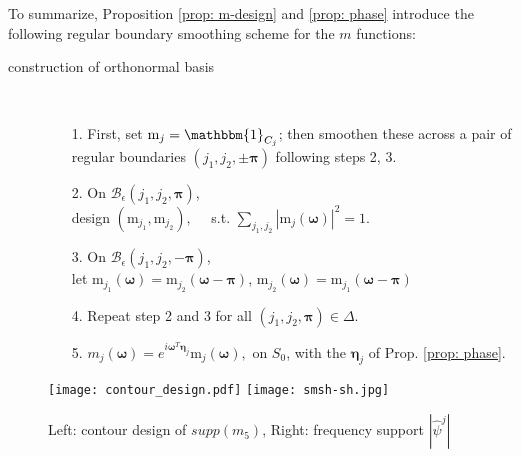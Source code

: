 To summarize, Proposition \ref{prop: m-design} and \ref{prop: phase} introduce the following regular boundary smoothing scheme for the $m$ functions:
\begin{description}%
\item[construction of orthonormal basis]\
\begin{itemize}
\item[1.] First, set $\mathrm{m}_j = \mathbbm{1}_{C_j}$; then smoothen these across a pair of regular boundaries $(j_1,j_2,\pm\boldsymbol{\pi})$ following steps 2, 3.
\item[2.]  On $\mathcal{B}_{\epsilon}(j_1,j_2,\boldsymbol{\pi})$,\\
\hspace*{2em} design $(\mathrm{m}_{j_1},\mathrm{m}_{j_2}),\quad$ s.t.
$\sum_{j_1,j_2}|\mathrm{m}_{j}(\boldsymbol{\omega})|^2= 1$.
\item[3.] On $\mathcal{B}_{\epsilon}(j_1,j_2,-\boldsymbol{\pi})$, \\
\hspace*{2em}let $\mathrm{m}_{j_1}(\boldsymbol{\omega}) = \mathrm{m}_{j_2}(\boldsymbol{\omega}-\boldsymbol{\pi})$, $\mathrm{m}_{j_2}(\boldsymbol{\omega}) = \mathrm{m}_{j_1}(\boldsymbol{\omega}-\boldsymbol{\pi})$\vspace*{.1em}
\item[4.] Repeat step 2 and 3 for all $(j_1,j_2,\boldsymbol{\pi})\in\Delta$. 
\item[5.]$m_j(\boldsymbol{\omega}) =e^{i\boldsymbol{\omega}^T\boldsymbol{\eta}_j} \mathrm{m}_j(\boldsymbol{\omega}),$ on $S_0$, with the $\boldsymbol{\eta}_j$ of Prop. \ref{prop: phase}.
\end{itemize}
\end{description}

\begin{figure}[!t]
\centering
\texttt{[image: contour\_design.pdf]}\hspace*{2mm}
\texttt{[image: smsh-sh.jpg]}
\caption{ Left: contour design of $supp(m_5)$, Right: frequency support $|\hat{\psi}^j|$}
\label{fig: design}
\end{figure}


